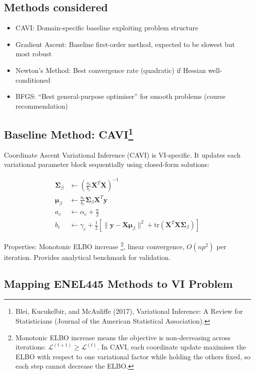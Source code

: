 \documentclass[11pt]{article}
\newcommand{\tr}{\text{tr}}
\begin{document}
\subsection*{Methods considered}

\begin{itemize}
\item CAVI: Domain-specific baseline exploiting problem structure
\item Gradient Ascent: Baseline first-order method, expected to be slowest but most robust
\item Newton's Method: Best convergence rate (quadratic) if Hessian well-conditioned
\item BFGS: ``Best general-purpose optimiser'' for smooth problems (course recommendation)
\end{itemize}

\subsection*{Baseline Method: CAVI\footnote{Blei, Kucukelbir, and McAuliffe (2017), Variational Inference: A Review for Statisticians (Journal of the American Statistical Association).}}

Coordinate Ascent Variational Inference (CAVI) is VI-specific. It updates each variational parameter block sequentially using closed-form solutions:

\begin{align}
\bm{\Sigma}_\beta &\leftarrow \left(\frac{a_e}{b_e} \bm{X}^T\bm{X}\right)^{-1}\\
\bm{\mu}_\beta &\leftarrow \frac{a_e}{b_e} \bm{\Sigma}_\beta \bm{X}^T\bm{y}\\
a_e &\leftarrow \alpha_e + \frac{n}{2}\\
b_e &\leftarrow \gamma_e + \frac{1}{2}\left[\|\bm{y} - \bm{X}\bm{\mu}_\beta\|^2 + \tr(\bm{X}^T\bm{X}\bm{\Sigma}_\beta)\right]
\end{align}

Properties: Monotonic ELBO increase \footnote{Monotonic ELBO increase means the objective is non-decreasing across iterations: $\mathcal{L}^{(t+1)} \ge \mathcal{L}^{(t)}$. In CAVI, each coordinate update maximises the ELBO with respect to one variational factor while holding the others fixed, so each step cannot decrease the ELBO.}, linear convergence, $O(np^2)$ per iteration. Provides analytical benchmark for validation.


\newpage 

\subsection*{Mapping ENEL445 Methods to VI Problem}
\end{document}
